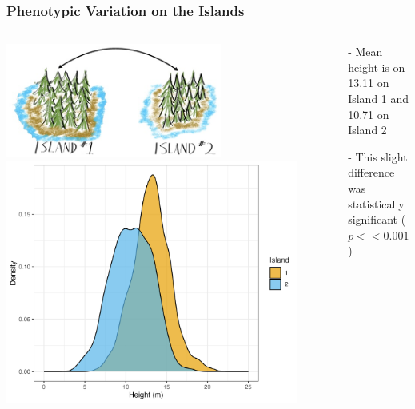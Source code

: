\documentclass[xcolor=dvipsnames]{beamer}
\begin{document}
\begin{frame}
	\frametitle{Phenotypic Variation on the Islands}
	\begin{columns}
		\begin{column}{0.65\textwidth}

				\centering
		\includegraphics[keepaspectratio, width  = 0.7\textwidth]{img/treeIslands}
						\includegraphics[keepaspectratio, width  = 0.95\textwidth]{img/treePhens.png}				

			
		\end{column}
		\begin{column}{0.4\textwidth}
			\begin{itemize}
				\item[-] Mean height is on 13.11 on Island 1 and 10.71 on Island 2  
				\item[-] This slight difference was statistically significant ($p<<0.001$)
						\end{itemize}
		\end{column}
	\end{columns}
 \end{frame}
 
\end{document}
